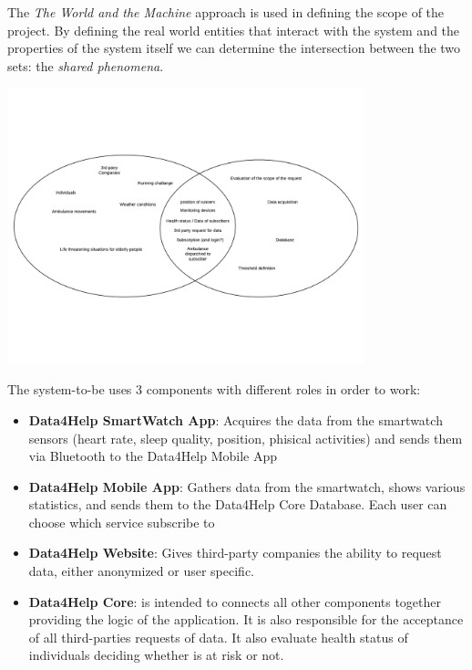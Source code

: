 

The \textit{The World and the Machine} approach is used in defining the scope of the project.
By defining the real world entities that interact with the system and the properties of the system itself we can determine the intersection between the two sets: the \textit{shared phenomena}.
\begin{center}
    \includegraphics[height=8cm,keepaspectratio]{assets/twatm.pdf}
\end{center}

The system-to-be uses 3 components with different roles in order to work:
\begin{itemize}
    \item \textbf{Data4Help SmartWatch App}: Acquires the data from the smartwatch sensors (heart rate, sleep quality, position, phisical activities) and sends them via Bluetooth to the Data4Help Mobile App
    \item \textbf{Data4Help Mobile App}: Gathers data from the smartwatch, shows various statistics, and sends them to the Data4Help Core Database. Each user can choose which service subscribe to
    \item \textbf{Data4Help Website}: Gives third-party companies the ability to request data, either anonymized or user specific.
    \item \textbf{Data4Help Core}: is intended to connects all other components together providing the logic of the application. It is also responsible for the acceptance of all third-parties requests of data. It also evaluate health status of individuals deciding whether is at risk or not.
\end{itemize}


